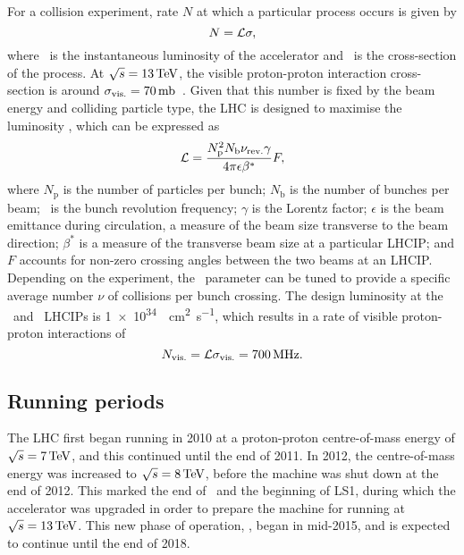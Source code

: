 For a collision experiment, rate $N$ at which a particular process occurs is 
given by
\begin{equation}
  N = \mathcal{L}\sigma,
  \label{eqn:intro:lhc:lumi_xsec}
\end{equation}
where \lumi\ is the instantaneous luminosity of the accelerator and \xsec\ is 
the cross-section of the process.
At $\sqrts = \SI{13}{\TeV}$, the visible proton-proton interaction 
cross-section is around $\xsecppvis = 
\SI{70}{\milli\barn}$~\cite{Aaboud:2016mmw,CMS:2016ael}.
Given that this number is fixed by the beam energy and colliding particle type, 
the \ac{LHC} is designed to maximise the luminosity \lumi, which can be 
expressed as
\begin{equation}
  \mathcal{L} = \frac{N_{\text{p}}^{2}N_{\text{b}}\nu_{\textnormal{rev.}}\gamma}{4\pi\epsilon\beta^{*}}F,
  \label{eqn:intro:lhc:inst_lumi}
\end{equation}
where $N_{\text{p}}$ is the number of particles per bunch; $N_{\text{b}}$ is 
the number of bunches per beam; \revfreq\ is the bunch revolution frequency; 
$\gamma$ is the Lorentz factor; $\epsilon$ is the beam emittance during 
circulation, a measure of the beam size transverse to the beam direction; 
$\beta^{*}$ is a measure of the transverse beam size at a particular 
\ac{LHCIP}; and $F$ accounts for non-zero crossing angles between the two beams 
at an \ac{LHCIP}.
Depending on the experiment, the \betastar\ parameter can be tuned to provide a 
specific average number $\nu$ of collisions per bunch crossing.
The design luminosity at the \atlas\ and \cms\ \acp{LHCIP} is
\SI{1e34}{\per\square\centi\metre\per\second}, which results in a rate of 
visible proton-proton interactions of
\begin{equation}
  N_{\text{vis.}} = \mathcal{L}\sigma_{\textnormal{vis.}}
                  = \SI{700}{\mega\hertz}.
  \label{eqn:intro:lhc:nppvis}
\end{equation}

\subsection{Running periods}

The \ac{LHC} first began running in 2010 at a proton-proton centre-of-mass 
energy of $\sqrts = \SI{7}{\TeV}$, and this continued until the end of 2011.
In 2012, the centre-of-mass energy was increased to $\sqrts = \SI{8}{\TeV}$, 
before the machine was shut down at the end of 2012.
This marked the end of \runone\ and the beginning of \acf{LS1}, during which 
the accelerator was upgraded in order to prepare the machine for running at 
$\sqrts = \SI{13}{\TeV}$.
This new phase of operation, \runtwo, began in mid-2015, and is expected to 
continue until the end of 2018.
